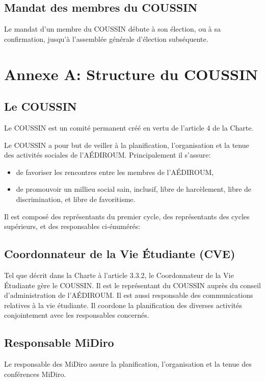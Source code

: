 \documentclass{aediroum}
\begin{document}
\subsection{Mandat des membres du COUSSIN}
Le mandat d'un membre du COUSSIN débute à son élection, ou à sa confirmation, jusqu'à l'assemblée générale d'élection subséquente.

\section{Annexe A: Structure du COUSSIN}

\setcounter{subsection}{-1}
\subsection{Le COUSSIN}
Le COUSSIN est un comité permanent créé en vertu de l'article 4 de la Charte.

Le COUSSIN a pour but de veiller à la planification, l'organisation et la tenue des activités sociales de l'AÉDIROUM. Principalement il s'assure:
\begin{itemize}
	\item de favoriser les rencontres entre les membres de l'AÉDIROUM,
	\item de promouvoir un millieu social sain, inclusif, libre de harcèlement, libre de discrimination, et libre de favoritisme.
\end{itemize}

Il est composé des représentants du premier cycle, des représentants des cycles supérieurs, et des responsables ci-énumérés:

\subsection{Coordonnateur de la Vie Étudiante (CVE)}
Tel que décrit dans la Charte à l'article 3.3.2, le Coordonnateur de la Vie Étudiante gère le COUSSIN. Il est le représentant du COUSSIN auprès du conseil d'administration de l'AÉDIROUM. Il est aussi responsable des communications relatives à la vie étudiante. Il coordone la planification des diverses activités conjointement avec les responsables concernés.

\subsection{Responsable MiDiro}
Le responsable des MiDiro assure la planification, l'organisation et la tenue des conférences MiDiro.
\end{document}
